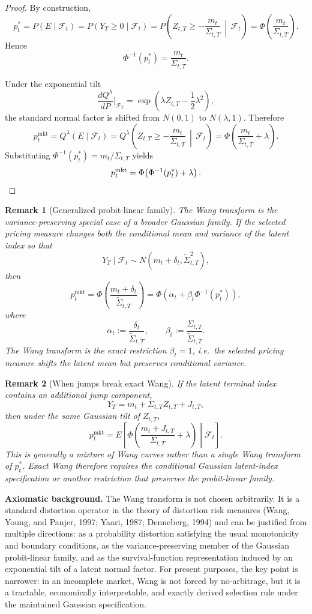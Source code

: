 \documentclass[12pt,a4paper]{article}
\newtheorem{remark}{Remark}
\begin{document}
\begin{proof}
By construction,
\[
p_t^*
=
P(E\mid\mathcal F_t)
=
P\!\left(Y_T\ge 0\mid\mathcal F_t\right)
=
P\!\left(Z_{t,T}\ge -\frac{m_t}{\Sigma_{t,T}} \,\middle|\, \mathcal F_t\right)
=
\Phi\!\left(\frac{m_t}{\Sigma_{t,T}}\right).
\]
Hence
\[
\Phi^{-1}(p_t^*)=\frac{m_t}{\Sigma_{t,T}}.
\]

Under the exponential tilt
\[
\frac{dQ^\lambda}{dP}\Big|_{\mathcal F_T}
=
\exp\!\left(\lambda Z_{t,T}-\frac{1}{2}\lambda^2\right),
\]
the standard normal factor is shifted from $N(0,1)$ to $N(\lambda,1)$. Therefore
\[
p_t^{\mathrm{mkt}}
=
Q^\lambda(E\mid\mathcal F_t)
=
Q^\lambda\!\left(Z_{t,T}\ge -\frac{m_t}{\Sigma_{t,T}} \,\middle|\, \mathcal F_t\right)
=
\Phi\!\left(\frac{m_t}{\Sigma_{t,T}}+\lambda\right).
\]
Substituting $\Phi^{-1}(p_t^*)=m_t/\Sigma_{t,T}$ yields
\[
p_t^{\mathrm{mkt}}
=
\Phi\!\left(\Phi^{-1}(p_t^*)+\lambda\right).
\qedhere
\]
\end{proof}

\begin{remark}[Generalized probit-linear family]
The Wang transform is the variance-preserving special case of a broader Gaussian family. If the selected pricing measure changes both the conditional mean and variance of the latent index so that
\[
Y_T\mid \mathcal F_t \sim N(m_t+\delta_t,\tilde\Sigma_{t,T}^2),
\]
then
\[
p_t^{\mathrm{mkt}}
=
\Phi\!\left(\frac{m_t+\delta_t}{\tilde\Sigma_{t,T}}\right)
=
\Phi\!\left(\alpha_t+\beta_t\Phi^{-1}(p_t^*)\right),
\]
where
\[
\alpha_t:=\frac{\delta_t}{\tilde\Sigma_{t,T}},
\qquad
\beta_t:=\frac{\Sigma_{t,T}}{\tilde\Sigma_{t,T}}.
\]
The Wang transform is the exact restriction $\beta_t=1$, i.e.\ the selected pricing measure shifts the latent mean but preserves conditional variance.
\end{remark}

\begin{remark}[When jumps break exact Wang]
If the latent terminal index contains an additional jump component,
\[
Y_T = m_t + \Sigma_{t,T} Z_{t,T} + J_{t,T},
\]
then under the same Gaussian tilt of $Z_{t,T}$,
\[
p_t^{\mathrm{mkt}}
=
E\!\left[
\Phi\!\left(\frac{m_t+J_{t,T}}{\Sigma_{t,T}}+\lambda\right)
\middle| \mathcal F_t
\right].
\]
This is generally a mixture of Wang curves rather than a single Wang transform of $p_t^*$. Exact Wang therefore requires the conditional Gaussian latent-index specification or another restriction that preserves the probit-linear family.
\end{remark}

\textbf{Axiomatic background.} The Wang transform is not chosen arbitrarily. It is a standard distortion operator in the theory of distortion risk measures (Wang, Young, and Panjer, 1997; Yaari, 1987; Denneberg, 1994) and can be justified from multiple directions: as a probability distortion satisfying the usual monotonicity and boundary conditions, as the variance-preserving member of the Gaussian probit-linear family, and as the survival-function representation induced by an exponential tilt of a latent normal factor. For present purposes, the key point is narrower: in an incomplete market, Wang is not forced by no-arbitrage, but it is a tractable, economically interpretable, and exactly derived selection rule under the maintained Gaussian specification.
\end{document}
